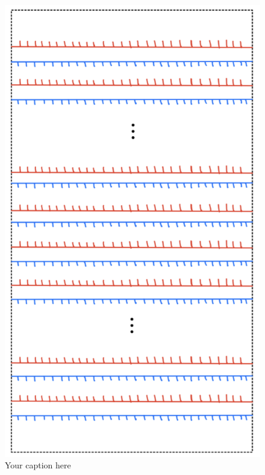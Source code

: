 \begin{figure}[H] 
    \centering
    \includegraphics[scale = 0.95]{diagrams/local_systems_on_as_diagrams/14.png} 
    \caption{Your caption here}
    \label{fig:your-label}
\end{figure}

